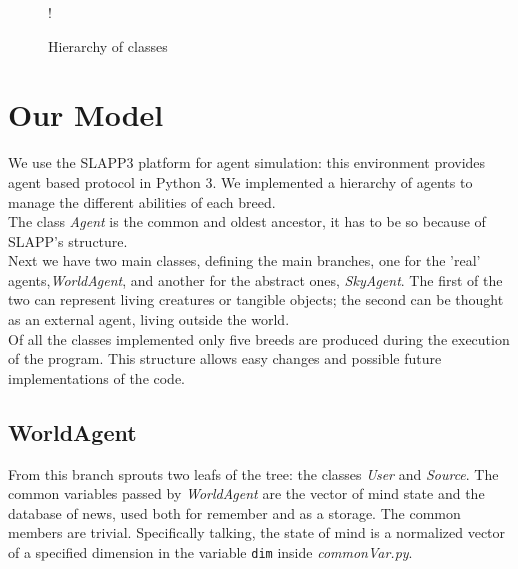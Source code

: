 \begin{figure}
  \begin{center}
     {!} {
    }
  \end{center}
  \caption{Hierarchy of classes}
  \label{fig:hierarchy}
\end{figure}
\section{Our Model}
We use the SLAPP3 platform for agent simulation: this environment provides agent
based protocol in Python 3.
We implemented a hierarchy of agents to manage the different abilities of
each breed.
\\
The class \textit{Agent} is the common and oldest ancestor,
it has to be so because of SLAPP's structure.\\
Next we have two main classes, defining the main branches,
one for the 'real' agents,\textit{WorldAgent}, and another for
the abstract ones, \textit{SkyAgent}.
The first of the two can represent living creatures or tangible objects;
the second can be thought as an external agent, living outside the world.\\
Of all the classes implemented only five breeds are produced during
the execution of the program.
This structure allows easy changes and possible future implementations
of the code.

\subsection{WorldAgent}
From this branch sprouts two leafs of the tree: the classes \textit{User}
and \textit{Source}.
The common variables passed by \textit{WorldAgent} are
the vector of mind state and the database of news, used both for remember
and as a storage. The common members are trivial.
Specifically talking, the state of mind is a normalized vector of a
specified dimension in the variable \texttt{dim} inside
\textit{commonVar.py}.

